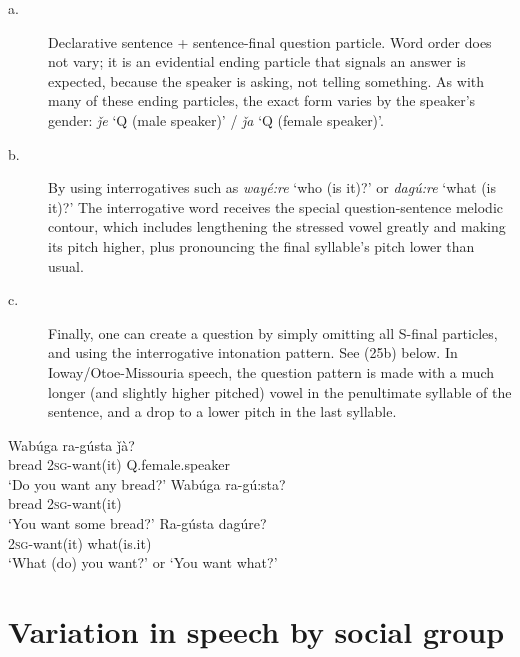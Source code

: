 \documentclass[output=paper]{LSP/langsci}
\begin{document}
\begin{description}
\item[a.] Declarative sentence + sentence-final question particle. Word order does not vary; it is an evidential ending particle that signals an answer is expected, because the speaker is asking, not telling something.  As with many of these ending particles, the exact form varies by the speaker's gender: \textit{\v{j}e} `Q (male speaker)' / \textit{\v{j}a} `Q (female speaker)'. 

\item[b.]  By using interrogatives such as \textit{way\'e:re} `who (is it)?' or \textit{dagú:re} `what (is it)?' The interrogative word receives the special question-sentence melodic contour, which includes lengthening the stressed vowel greatly and making its pitch higher, plus pronouncing the final syllable's pitch lower than usual.  	

\item[c.]  Finally, one can create a question by simply omitting all S-final particles, and using the interrogative intonation pattern. See (25b) below.  In Ioway/Otoe-Missouria speech, the question pattern is made with a much longer (and slightly higher pitched) vowel in the penultimate syllable of the sentence, and a drop to a lower pitch in the last syllable.	
\end{description}
\begin{exe}
\ex
\begin{xlist}	       		          	     
\ex \gll Wabúga ra-gústa       \v{j}\`a?  \\						 	      		
bread       2\textsc{sg}-want(it) Q.female.speaker \\					     		
\trans `Do you want any bread?' 
\ex \gll Wabúga ra-gú:sta? \\					 	 	         		
bread        2\textsc{sg}-want(it) \\			     	     		
\trans `You want some bread?'	
\ex \gll Ra-gústa    dagúre?  \\							        		
2\textsc{sg}-want(it) what(is.it) \\				                    		 	
\trans `What (do) you want?' or `You want what?'
\end{xlist}
\end{exe}

\section{Variation in speech by social group}
\end{document}
